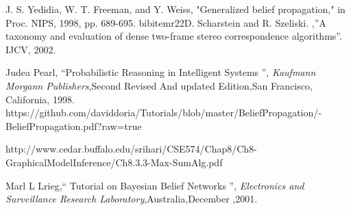 \begin{thebibliography}{1}
J. S. Yedidia, W. T. Freeman, and Y. Weiss, "Generalized belief
     propagation," in Proc. NIPS, 1998, pp. 689-695.
bibitem{r22}D. Scharstein and R. Szeliski. ,''A taxonomy and evaluation of dense
two-frame stereo correspondence algorithms''. IJCV, 2002.

 Judea Pearl, ``Probabilistic Reasoning in Intelligent Systems '', \emph{Kaufmann Morgann Publishers},Second Revised And updated Edition,San Francisco, California, 1998.
%
 https://github.com/daviddoria/Tutorials/blob/master/BeliefPropagation/-BeliefPropagation.pdf?raw=true

http://www.cedar.buffalo.edu/srihari/CSE574/Chap8/Ch8-GraphicalModelInference/Ch8.3.3-Max-SumAlg.pdf

 Marl L Lrieg,`` Tutorial on Bayesian Belief Networks '', \emph{Electronics and Surveillance Research Laboratory},Australia,December ,2001.
%
%
%
\end{thebibliography} 